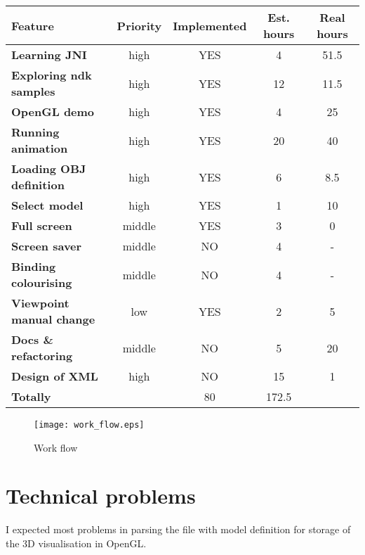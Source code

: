 \begin{tabular}{| l || c | c |  c | c |}
\hline
{\bf Feature} & {\bf Priority} & {\bf Implemented} & {\bf Est. hours} & {\bf Real hours}\\
\hline
\hline
\textbf{Learning JNI} & high & YES &                 4 & 51.5\\
\textbf{Exploring ndk samples} & high & YES &       12 & 11.5\\
\textbf{OpenGL demo} & high & YES &                  4 & 25\\
\textbf{Running animation} & high & YES &           20 & 40\\
\textbf{Loading OBJ definition} & high & YES &       6 &  8.5\\
\textbf{Select model} & high & YES &                 1 & 10\\
\textbf{Full screen} & middle & YES &                3 &  0\\
\textbf{Screen saver} & middle & NO &                4 &  -\\
\textbf{Binding colourising} & middle & NO &         4 & -\\
\textbf{Viewpoint manual change}  & low & YES &       2 & 5\\
\textbf{Docs \& refactoring} & middle & NO &         5 & 20\\
\textbf{Design of XML} & high & NO &                15 & 1\\
\hline
\textbf{Totally} & &                                80 & 172.5 \\
\hline
\end{tabular}

\begin{figure}
\texttt{[image: work\_flow.eps]}
\label{work_flow}
\caption{Work flow}
\end{figure}


\section*{Technical problems} %
\label{sec:Technical problems}
I expected most problems in parsing the file with model definition
for storage of the 3D visualisation in OpenGL.

